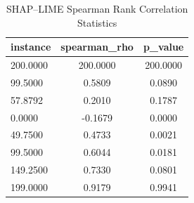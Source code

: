 \begin{table}
\centering
\caption{SHAP–LIME Spearman Rank Correlation Statistics}
\label{tab:agreement}
\begin{tabular}{lcc}
\toprule
instance & spearman_rho & p_value \\
\midrule
200.0000 & 200.0000 & 200.0000 \\
99.5000 & 0.5809 & 0.0890 \\
57.8792 & 0.2010 & 0.1787 \\
0.0000 & -0.1679 & 0.0000 \\
49.7500 & 0.4733 & 0.0021 \\
99.5000 & 0.6044 & 0.0181 \\
149.2500 & 0.7330 & 0.0801 \\
199.0000 & 0.9179 & 0.9941 \\
\bottomrule
\end{tabular}
\end{table}
